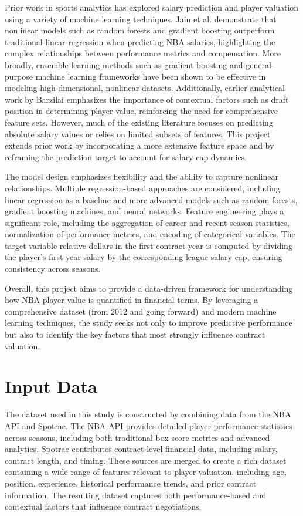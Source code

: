 \documentclass[conference]{IEEEtran}
\begin{document}
Prior work in sports analytics has explored salary prediction and player valuation using a variety of machine learning techniques. Jain et al. \cite{10041664} demonstrate that nonlinear models such as random forests and gradient boosting outperform traditional linear regression when predicting NBA salaries, highlighting the complex relationships between performance metrics and compensation. More broadly, ensemble learning methods such as gradient boosting \cite{xgboost} and general-purpose machine learning frameworks \cite{sklearn} have been shown to be effective in modeling high-dimensional, nonlinear datasets. Additionally, earlier analytical work by Barzilai \cite{barzilai2007nba} emphasizes the importance of contextual factors such as draft position in determining player value, reinforcing the need for comprehensive feature sets. However, much of the existing literature focuses on predicting absolute salary values or relies on limited subsets of features. This project extends prior work by incorporating a more extensive feature space and by reframing the prediction target to account for salary cap dynamics.


The model design emphasizes flexibility and the ability to capture nonlinear relationships. Multiple regression-based approaches are considered, including linear regression as a baseline and more advanced models such as random forests, gradient boosting machines, and neural networks. Feature engineering plays a significant role, including the aggregation of career and recent-season statistics, normalization of performance metrics, and encoding of categorical variables. The target variable relative dollars in the first contract year is computed by dividing the player's first-year salary by the corresponding league salary cap, ensuring consistency across seasons.

Overall, this project aims to provide a data-driven framework for understanding how NBA player value is quantified in financial terms. By leveraging a comprehensive dataset (from 2012 and going forward) and modern machine learning techniques, the study seeks not only to improve predictive performance but also to identify the key factors that most strongly influence contract valuation.

\section{Input Data}
The dataset used in this study is constructed by combining data from the NBA API and Spotrac. The NBA API provides detailed player performance statistics across seasons, including both traditional box score metrics and advanced analytics. Spotrac contributes contract-level financial data, including salary, contract length, and timing. These sources are merged to create a rich dataset containing a wide range of features relevant to player valuation, including age, position, experience, historical performance trends, and prior contract information. The resulting dataset captures both performance-based and contextual factors that influence contract negotiations.
\end{document}
